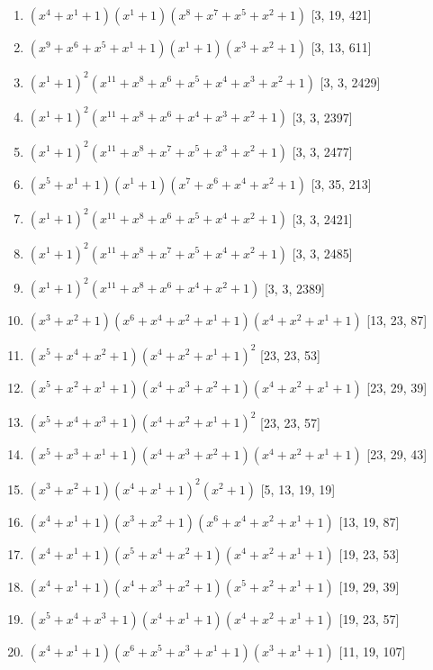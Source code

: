 \documentclass[10pt,twocolumn]{article}
\begin{document}
\begin{enumerate}
\item $(x^{4} + x^{1} + 1)(x^{1} + 1)(x^{8} + x^{7} + x^{5} + x^{2} + 1)$  [3, 19, 421]
\item $(x^{9} + x^{6} + x^{5} + x^{1} + 1)(x^{1} + 1)(x^{3} + x^{2} + 1)$  [3, 13, 611]
\item $(x^{1} + 1)^{2}(x^{11} + x^{8} + x^{6} + x^{5} + x^{4} + x^{3} + x^{2} + 1)$  [3, 3, 2429]
\item $(x^{1} + 1)^{2}(x^{11} + x^{8} + x^{6} + x^{4} + x^{3} + x^{2} + 1)$  [3, 3, 2397]
\item $(x^{1} + 1)^{2}(x^{11} + x^{8} + x^{7} + x^{5} + x^{3} + x^{2} + 1)$  [3, 3, 2477]
\item $(x^{5} + x^{1} + 1)(x^{1} + 1)(x^{7} + x^{6} + x^{4} + x^{2} + 1)$  [3, 35, 213]
\item $(x^{1} + 1)^{2}(x^{11} + x^{8} + x^{6} + x^{5} + x^{4} + x^{2} + 1)$  [3, 3, 2421]
\item $(x^{1} + 1)^{2}(x^{11} + x^{8} + x^{7} + x^{5} + x^{4} + x^{2} + 1)$  [3, 3, 2485]
\item $(x^{1} + 1)^{2}(x^{11} + x^{8} + x^{6} + x^{4} + x^{2} + 1)$  [3, 3, 2389]
\item $(x^{3} + x^{2} + 1)(x^{6} + x^{4} + x^{2} + x^{1} + 1)(x^{4} + x^{2} + x^{1} + 1)$  [13, 23, 87]
\item $(x^{5} + x^{4} + x^{2} + 1)(x^{4} + x^{2} + x^{1} + 1)^{2}$  [23, 23, 53]
\item $(x^{5} + x^{2} + x^{1} + 1)(x^{4} + x^{3} + x^{2} + 1)(x^{4} + x^{2} + x^{1} + 1)$  [23, 29, 39]
\item $(x^{5} + x^{4} + x^{3} + 1)(x^{4} + x^{2} + x^{1} + 1)^{2}$  [23, 23, 57]
\item $(x^{5} + x^{3} + x^{1} + 1)(x^{4} + x^{3} + x^{2} + 1)(x^{4} + x^{2} + x^{1} + 1)$  [23, 29, 43]
\item $(x^{3} + x^{2} + 1)(x^{4} + x^{1} + 1)^{2}(x^{2} + 1)$  [5, 13, 19, 19]
\item $(x^{4} + x^{1} + 1)(x^{3} + x^{2} + 1)(x^{6} + x^{4} + x^{2} + x^{1} + 1)$  [13, 19, 87]
\item $(x^{4} + x^{1} + 1)(x^{5} + x^{4} + x^{2} + 1)(x^{4} + x^{2} + x^{1} + 1)$  [19, 23, 53]
\item $(x^{4} + x^{1} + 1)(x^{4} + x^{3} + x^{2} + 1)(x^{5} + x^{2} + x^{1} + 1)$  [19, 29, 39]
\item $(x^{5} + x^{4} + x^{3} + 1)(x^{4} + x^{1} + 1)(x^{4} + x^{2} + x^{1} + 1)$  [19, 23, 57]
\item $(x^{4} + x^{1} + 1)(x^{6} + x^{5} + x^{3} + x^{1} + 1)(x^{3} + x^{1} + 1)$  [11, 19, 107]

\end{enumerate}
\end{document}
